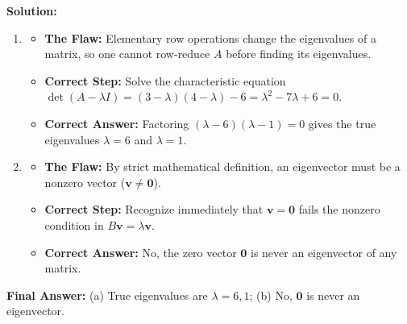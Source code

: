 \documentclass[11pt, letterpaper]{article}
\theoremstyle{definition}
\theoremstyle{remark}
\begin{document}
\textbf{Solution:}
\begin{enumerate}[label=(\alph*)]
    \item \begin{itemize}
        \item \textbf{The Flaw:} Elementary row operations change the eigenvalues of a matrix, so one cannot row-reduce $A$ before finding its eigenvalues.
        \item \textbf{Correct Step:} Solve the characteristic equation $\det(A - \lambda I) = (3 - \lambda)(4 - \lambda) - 6 = \lambda^2 - 7\lambda + 6 = 0$.
        \item \textbf{Correct Answer:} Factoring $(\lambda - 6)(\lambda - 1) = 0$ gives the true eigenvalues $\lambda = 6$ and $\lambda = 1$.
    \end{itemize}
    \item \begin{itemize}
        \item \textbf{The Flaw:} By strict mathematical definition, an eigenvector must be a nonzero vector ($\mathbf{v} \neq \mathbf{0}$).
        \item \textbf{Correct Step:} Recognize immediately that $\mathbf{v} = \mathbf{0}$ fails the nonzero condition in $B\mathbf{v} = \lambda\mathbf{v}$.
        \item \textbf{Correct Answer:} No, the zero vector $\mathbf{0}$ is never an eigenvector of any matrix.
    \end{itemize}
\end{enumerate}
\textbf{Final Answer:} (a) True eigenvalues are $\lambda = 6, 1$; (b) No, $\mathbf{0}$ is never an eigenvector.
\end{document}

